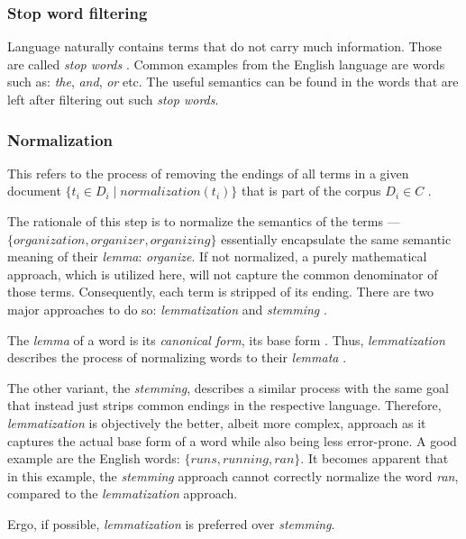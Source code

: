 \documentclass[12pt,a4paper]{report}
\begin{document}
\subsubsection{Stop word filtering}
Language naturally contains terms that do
not carry much information. Those are called \textit{stop words}
\cite{singhal2001ir}. Common examples from the English language are words such as:
\textit{the}, \textit{and}, \textit{or} etc. The useful semantics can be found
in the words that are left after filtering out such \textit{stop words}.


\subsubsection{Normalization}
This refers to the process of
removing the endings of all terms in a given document
\(\{t_i \in D_i \mid normalization(t_i)\}\) that is part of the corpus
\(D_i \in C\) \cite{singhal2001ir}.

The rationale of this step is to normalize the semantics of the terms ---\\
\(\{\textit{organization}, \textit{organizer}, \textit{organizing}\}\) essentially
encapsulate the same semantic meaning of their \textit{lemma}: \textit{organize}.
If not normalized, a purely mathematical approach, which is
utilized here, will not capture the common denominator of those terms.
Consequently, each term is stripped of its ending. There are two major
approaches to do so: \textit{lemmatization} and \textit{stemming}
\cite{plisson2004lemma}.

The \textit{lemma} of a word is its \textit{canonical form}, its base form
\cite{plisson2004lemma}. Thus, \textit{lemmatization} describes the process of
normalizing words to their \textit{lemmata} \cite{plisson2004lemma}.

The other variant, the \textit{stemming}, describes a similar process with the
same goal that instead just strips common endings in the respective language.
Therefore, \textit{lemmatization} is objectively the better, albeit more
complex, approach as it captures the actual base form of a word while also
being less error-prone. A good example are the English words: \(\{\textit{
runs}, \textit{running}, \textit{ran}\}\). It becomes apparent that in this
example, the \textit{stemming} approach cannot correctly normalize the
word \textit{ran}, compared to the \textit{lemmatization} approach.

Ergo, if possible, \textit{lemmatization} is preferred over \textit{stemming}.
\end{document}
